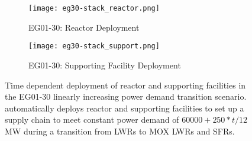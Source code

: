 \begin{figure}[]
	\centering
	\begin{subfigure}[t]{1.2\textwidth}
		\centering
		\texttt{[image: eg30-stack\_reactor.png]} 
		\caption{EG01-30: Reactor Deployment}
		\label{fig:30reactor}
	\end{subfigure}
	\vspace{1cm}
	\begin{subfigure}[t]{1.2\textwidth}
		\centering
		\texttt{[image: eg30-stack\_support.png]} 
		\caption{EG01-30: Supporting Facility Deployment}
		\label{fig:30support}
	\end{subfigure}
	\hfill
	\caption{Time dependent deployment of reactor and supporting facilities in 
	the EG01-30 linearly increasing power demand transition scenario. 
	\deploy automatically deploys reactor and supporting facilities 
	to set up a supply chain to meet constant power demand of $60000 + 250*t/12$ MW
	during a transition from \glspl{LWR} to MOX LWRs and \glspl{SFR}. }
	\label{fig:23stack}
\end{figure}

